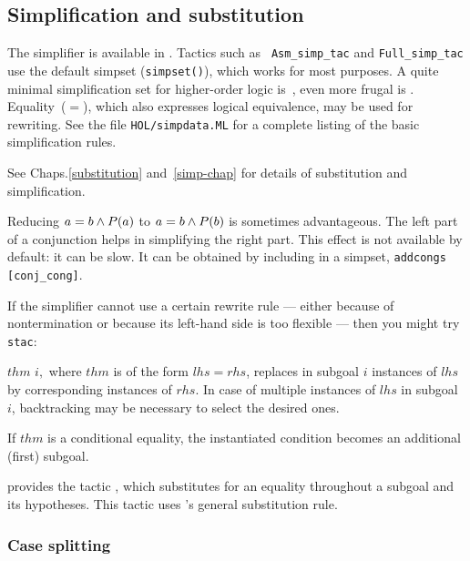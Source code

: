 \subsection{Simplification and substitution}

The simplifier is available in \HOL.  Tactics such as {\tt
  Asm_simp_tac} and \texttt{Full_simp_tac} use the default simpset
({\tt simpset()}), which works for most purposes.  A quite minimal
simplification set for higher-order logic is~,
even more frugal is .  Equality~($=$), which
also expresses logical equivalence, may be used for rewriting.  See
the file \texttt{HOL/simpdata.ML} for a complete listing of the basic
simplification rules.

See %
{Chaps.\ts\ref{substitution} and~\ref{simp-chap}} for details of substitution
and simplification.

\begin{warn}%
  Reducing $a=b\wedge P(a)$ to $a=b\wedge P(b)$ is sometimes advantageous.  The
  left part of a conjunction helps in simplifying the right part.  This effect
  is not available by default: it can be slow.  It can be obtained by
  including  in a simpset, \verb$addcongs [conj_cong]$.
\end{warn}

If the simplifier cannot use a certain rewrite rule --- either because
of nontermination or because its left-hand side is too flexible ---
then you might try \texttt{stac}:
\begin{ttdescription}
\item[\ttindexbold{stac} $thm$ $i,$] where $thm$ is of the form $lhs = rhs$,
  replaces in subgoal $i$ instances of $lhs$ by corresponding instances of
  $rhs$.  In case of multiple instances of $lhs$ in subgoal $i$, backtracking
  may be necessary to select the desired ones.

If $thm$ is a conditional equality, the instantiated condition becomes an
additional (first) subgoal.
\end{ttdescription}

 \HOL{} provides the tactic , which substitutes
  for an equality throughout a subgoal and its hypotheses.  This tactic uses
  \HOL's general substitution rule.

\subsubsection{Case splitting}
\label{subsec:HOL:case:splitting}

